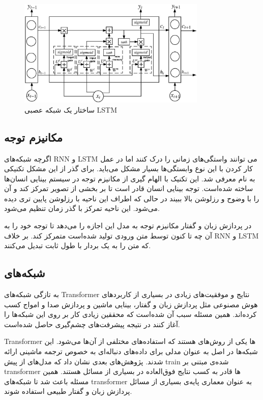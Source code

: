\documentclass[12pt, a4paper, oneside]{report}
\begin{document}
\begin{figure}[h]
    \centering
    \includegraphics[width=0.8\textwidth]{lstm}
    \caption{ساختار یک شبکه عصبی LSTM}
    \label{fig:lstm}
\end{figure}

\subsection{مکانیزم توجه}

اگرچه شبکه‌های
RNN
و
LSTM
می توانند واستگی‌های زمانی را درک کنند اما در عمل کار کردن با این نوع وابستگی‌ها بسیار مشکل می‌باید. برای گذر از این
مشکل تکنیکی به نام
معرفی شد. این تکنیک با الهام گیری از مکانیزم توجه در سیستم بینایی انسان‌ها ساخته شده‌است. توجه بینایی انسان قادر است
تا بر بخشی از تصویر تمرکز کند و آن را با وضوح و رزلوشن بالا ببیند در حالی که اطراف این ناحیه با رزلوشن پایین تری دیده می‌شود.
این ناحیه تمرکز با گذر زمان تنظیم می‌شود.

در پردازش زبان و گفتار مکانیزم توجه به مدل این اجازه را می‌دهد تا توجه خود را به آن چه تا کنون توسط متن ورودی تولید شده‌است
متمرکز کند. بر خلاف
RNN
و
LSTM
که متن را به یک بردار با طول ثابت تبدیل می‌کنند.

\subsection{شبکه‌های }
به تازگی شبکه‌های
Transformer
نتایج و موفقیت‌های زیادی در بسیاری از کاربرد‌های هوش مصنوعی مثل پردازش زبان و گفتار، بینایی ماشین و
پردازش صدا و امواج کسب کرده‌اند. همین مسئله سبب آن شده‌است که محققین زیادی کار بر روی این شبکه‌ها را آغاز کنند
در نتیجه پیشرفت‌های چشم‌گیری حاصل شده‌است.

Transformer
ها یکی از روش‌های
هستند که استفاده‌های مختلفی از آن‌ها می‌شود. این شبکه‌ها در اصل به عنوان مدلی برای داده‌های دنباله‌ای به خصوص
ترجمه ماشینی ارائه شدند. پژوهش‌های بعدی نشان داد که مدل‌های از پیش
train
شده‌ی مبتنی بر
transformer
ها قادر به کسب نتایج فوق‌العاده در بسیاری از مسائل هستند. همین مسئله باعث شد تا شبکه‌های
transformer
به عنوان معماری پایه‌ی بسیاری از مسائل پردازش زبان و گفتار طبیعی استفاده شوند.
\end{document}
